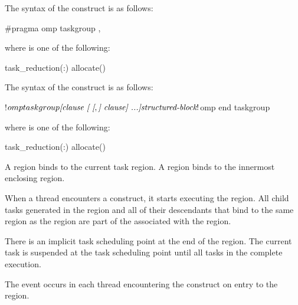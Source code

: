 \syntax
\begin{ccppspecific}
The syntax of the  construct is as follows:

\begin{ompcPragma}
#pragma omp taskgroup \plc{[clause[[},\plc{] clause] ...]} 
\end{ompcPragma}

where  is one of the following:

\begin{indentedcodelist}
task_reduction(:)
allocate(\plc{[allocator: ]})
\end{indentedcodelist}
\end{ccppspecific}

\begin{fortranspecific}
The syntax of the  construct is as follows:

\begin{ompfPragma}
!$omp taskgroup \plc{[clause [ [},\plc{] clause] ...]}
    \plc{structured-block}
!$omp end taskgroup
\end{ompfPragma}

where  is one of the following:

\begin{indentedcodelist}
task_reduction(:)
allocate(\plc{[allocator: ]})
\end{indentedcodelist}

\end{fortranspecific}

\binding
A  region binds to the current task region. A  region binds to
the innermost enclosing  region.

\descr
When a thread encounters a  construct, it starts executing
the region. All child tasks generated in the  region and all
of their descendants that bind to the same  region as the
 region are part of the  associated with
the  region.

There is an implicit task scheduling point at the end of the 
region. The current task is suspended at the task scheduling point until all
tasks in the  complete execution.

\events
The  event occurs in each thread encountering the
 construct on entry to the  region.

